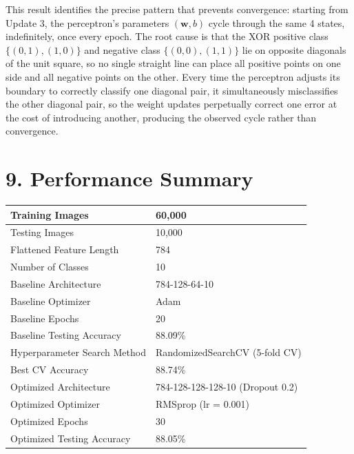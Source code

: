 \documentclass[11pt,a4paper]{article}
\begin{document}
\vspace{0.15cm}

This result identifies the precise pattern that prevents convergence: starting from Update 3, the perceptron's parameters $(\mathbf{w},b)$ cycle through the same 4 states, indefinitely, once every epoch. The root cause is that the XOR positive class $\{(0,1),(1,0)\}$ and negative class $\{(0,0),(1,1)\}$ lie on opposite diagonals of the unit square, so no single straight line can place all positive points on one side and all negative points on the other. Every time the perceptron adjusts its boundary to correctly classify one diagonal pair, it simultaneously misclassifies the other diagonal pair, so the weight updates perpetually correct one error at the cost of introducing another, producing the observed cycle rather than convergence.
\section*{9. Performance Summary}

\begin{center}
\begin{tabular}{|p{7cm}|p{5cm}|}
\hline
Training Images & 60{,}000\\
\hline
Testing Images & 10{,}000\\
\hline
Flattened Feature Length & 784\\
\hline
Number of Classes & 10\\
\hline
Baseline Architecture & 784-128-64-10\\
\hline
Baseline Optimizer & Adam\\
\hline
Baseline Epochs & 20\\
\hline
Baseline Testing Accuracy & 88.09\%\\
\hline
Hyperparameter Search Method & RandomizedSearchCV (5-fold CV)\\
\hline
Best CV Accuracy & 88.74\%\\
\hline
Optimized Architecture & 784-128-128-128-10 (Dropout 0.2)\\
\hline
Optimized Optimizer & RMSprop (lr = 0.001)\\
\hline
Optimized Epochs & 30\\
\hline
Optimized Testing Accuracy & 88.05\%\\
\hline
\end{tabular}
\end{center}


\end{document}
